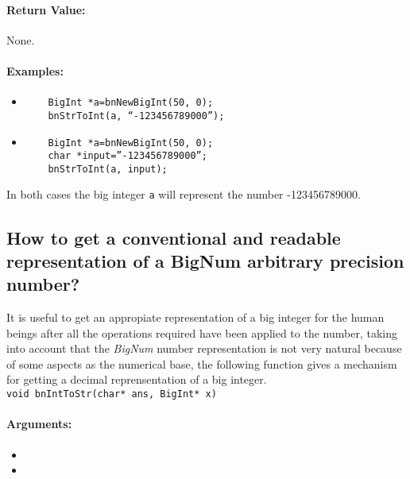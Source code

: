 \documentclass{book}
\begin{document}
\paragraph{Return Value:}

None.

\paragraph{Examples:}

\begin{itemize}
\item

\begin{verbatim}
	BigInt *a=bnNewBigInt(50, 0);
	bnStrToInt(a, “-123456789000”);
\end{verbatim}

\item

\begin{verbatim}
	BigInt *a=bnNewBigInt(50, 0);
	char *input=”-123456789000”;
	bnStrToInt(a, input);
\end{verbatim}
\end{itemize}

In both cases the big integer \verb+a+ will represent the number -123456789000.

\subsection{How to get a conventional and readable representation of a BigNum arbitrary precision number?}

It is useful to get an appropiate representation of a big integer for the human beings after all the operations required have been applied to the number, taking into account that the \emph{BigNum} number representation is not very natural because of some aspects as the numerical base, the following function gives a mechanism for getting a decimal reprensentation of a big integer.\\

\verb+void bnIntToStr(char* ans, BigInt* x)+\\

\paragraph{Arguments:}

\begin{itemize}
\item


\item 


\end{itemize}
\end{document}
